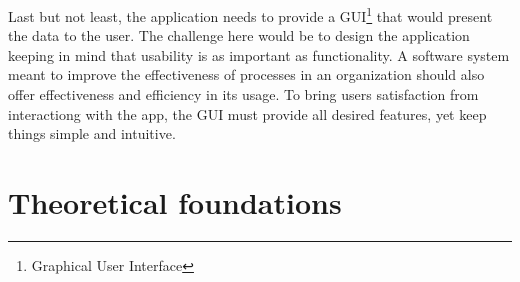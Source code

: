 Last but not least, the application needs to provide a GUI\footnote{Graphical User Interface} that would present the data to the user. The challenge here would be to design the application keeping in mind that usability is as important as functionality. A software system meant to improve the effectiveness of processes in an organization should also offer effectiveness and efficiency in its usage. To bring users satisfaction from interactiong with the app, the GUI must provide all desired features, yet keep things simple and intuitive.
















\section{Theoretical foundations}
\label{section:theoreticalFoundations}

\cite{patternsOfEnterpriseApplicationArchitecture}
\cite{buildingRESTfulWebServicesWithSpring}
\cite{tamingTheStateInReact}
\cite{cleanArchitecture}
\cite{highPerformanceMySQL}
\cite{modernEnterpriseUiDesign}
